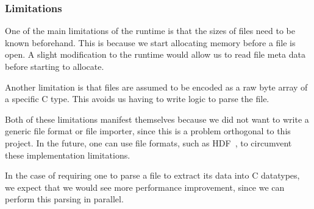 
\subsubsection{Limitations}

One of the main limitations of the runtime is that the sizes of files need to
	be known beforehand.
This is because we start allocating memory before a file is open.
A slight modification to the runtime would allow us to read file meta data 
	before starting to allocate.

Another limitation is that files are assumed to be encoded as a raw byte
	array of a specific C type.
This avoids us having to write logic to parse the file.

Both of these limitations manifest themselves because we did not want to 
	write a generic file format or file importer, since this is a problem 
	orthogonal to this project.
In the future, one can use file formats,
	such as HDF~\cite{folk2011overview}, to circumvent these implementation
	limitations.

In the case of requiring one to parse a file to extract its data into
	C datatypes, we expect that we would see more performance
	improvement, since we can perform this parsing in parallel.